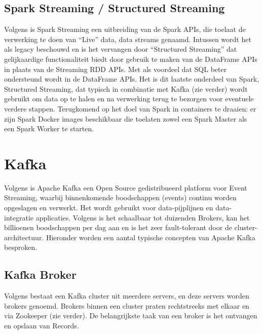 \subsection{Spark Streaming / Structured Streaming}
Volgens \autocite{Buuck2022} is Spark Streaming een uitbreiding van de Spark APIs, die toelaat de verwerking te doen van ``Live'' data, data streams genaamd. Intussen wordt het als legacy beschouwd en is het vervangen door ``Structured Streaming'' dat gelijkaardige functionaliteit biedt door gebruik te maken van de DataFrame APIs in plaats van de Streaming RDD APIs. Met als voordeel dat SQL beter ondersteund wordt in de DataFrame APIs.
\newline
\newline
Het is dit laatste onderdeel van Spark, Structured Streaming, dat typisch in combinatie met Kafka (zie verder) wordt gebruikt om data op te halen en na verwerking terug te bezorgen voor eventuele verdere stappen.
\newline
\newline
Terugkomend op het doel van Spark in containers te draaien: er zijn Spark Docker images beschikbaar die toelaten zowel een Spark Master als een Spark Worker te starten.


\section{Kafka}
Volgens \textcite{AwsAmazon2023b} is Apache Kafka een Open Source gedistribueerd platform voor Event Streaming, waarbij binnenkomende boodschappen (events) continu worden opgeslagen en verwerkt. Het wordt gebruikt voor data-pijplijnen en data-integratie applicaties.
Volgens \textcite{ASF2022b} is het schaalbaar tot duizenden Brokers, kan het billioenen boodschappen per dag aan en is het zeer fault-tolerant door de cluster-architectuur. Hieronder worden een aantal typische concepten van Apache Kafka besproken.

\subsection{Kafka Broker}
Volgens \textcite{GitBook2023} bestaat een Kafka cluster uit meerdere servers, en deze servers worden brokers genoemd. Brokers binnen een cluster praten rechtstreeks met elkaar en via Zookeeper (zie verder).
\newline
De belangrijkste taak van een broker is het ontvangen en opslaan van Records.

